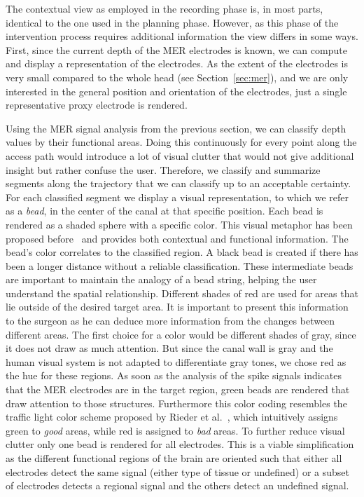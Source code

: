 \documentclass[review]{vgtc}                 %
\begin{document}
The contextual view as employed in the recording phase is, in most parts, identical to the one used in the planning phase. However, as this phase of the intervention process requires additional information the view differs in some ways. First, since the current depth of the MER electrodes is known, we can compute and display a representation of the electrodes. As the extent of the electrodes is very small compared to the whole head (see Section~\ref{sec:mer}), and we are only interested in the general position and orientation of the electrodes, just a single representative proxy electrode is rendered. 

Using the MER signal analysis from the previous section, we can classify depth values by their functional areas. Doing this continuously for every point along the access path would introduce a lot of visual clutter that would not give additional insight but rather confuse the user. Therefore, we classify and summarize segments along the trajectory that we can classify up to an acceptable certainty. For each classified segment we display a visual representation, to which we refer as a \emph{bead}, in the center of the canal at that specific position. Each bead is rendered as a shaded sphere with a specific color. This visual metaphor has been proposed before~\cite{Miocinovic2007,Haese2005} and provides both contextual and functional information. The bead's color correlates to the classified region. A black bead is created if there has been a longer distance without a reliable classification. These intermediate beads are important to maintain the analogy of a bead string, helping the user understand the spatial relationship. Different shades of red are used for areas that lie outside of the desired target area. It is important to present this information to the surgeon as he can deduce more information from the changes between different areas. The first choice for a color would be different shades of gray, since it does not draw as much attention. But since the canal wall is gray and the human visual system is not adapted to differentiate gray tones, we chose red as the hue for these regions. As soon as the analysis of the spike signals indicates that the MER electrodes are in the target region, green beads are rendered that draw attention to those structures. Furthermore this color coding resembles the traffic light color scheme proposed by Rieder et al.~\cite{Rieder2010}, which intuitively assigns green to {\it good} areas, while red is assigned to {\it bad} areas. To further reduce visual clutter only one bead is rendered for all electrodes. This is a viable simplification as the different functional regions of the brain are oriented such that either all electrodes detect the same signal (either type of tissue or undefined) or a subset of electrodes detects a regional signal and the others detect an undefined signal.
\end{document}
